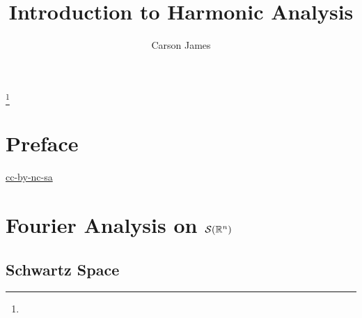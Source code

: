 \documentclass{book}
\begin{document}
	
	\frontmatter
	
	\title{Introduction to Harmonic Analysis}
	
	
	\author{Carson James}
	\thanks{}
	
	\date{}
	
	\maketitle
	
	
	\setcounter{page}{4}
	
	\tableofcontents
	\printunsrtglossary[type=symbols,style=long,title={Notation}]
	
	
	\mainmatter
	
	\chapter*{Preface}
	
	\begin{flushleft}
		\href{https://creativecommons.org/licenses/by-nc-sa/4.0/legalcode.txt}{cc-by-nc-sa}
	\end{flushleft}
	
	\newpage
	
	\newpage
	\chapter{Fourier Analysis on $\mathcal{S}(\mathbb{R}^n)$}	
	
	\section{Schwartz Space}
	
\end{document}
